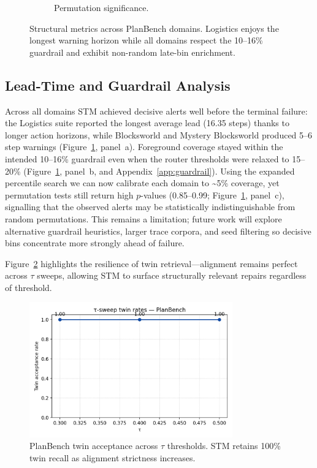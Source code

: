 \documentclass[11pt]{article}
\begin{document}
\begin{figure}[h]
\begin{subfigure}[t]{0.32\textwidth}
    \caption{Permutation significance.}
  \end{subfigure}
  \caption{Structural metrics across PlanBench domains. Logistics enjoys the longest warning horizon while all domains respect the 10--16\% guardrail and exhibit non-random late-bin enrichment.}
  \label{fig:planbench-metrics}
\end{figure}

\subsection{Lead-Time and Guardrail Analysis}
Across all domains STM achieved decisive alerts well before the terminal failure: the Logistics suite reported the longest average lead (16.35 steps) thanks to longer action horizons, while Blocksworld and Mystery Blocksworld produced 5--6 step warnings (Figure~\ref{fig:planbench-metrics}, panel~a). Foreground coverage stayed within the intended 10--16\% guardrail even when the router thresholds were relaxed to 15--20\% (Figure~\ref{fig:planbench-metrics}, panel~b, and Appendix~\ref{app:guardrail}). Using the expanded percentile search we can now calibrate each domain to \textasciitilde5\% coverage, yet permutation tests still return high $p$-values (0.85--0.99; Figure~\ref{fig:planbench-metrics}, panel~c), signalling that the observed alerts may be statistically indistinguishable from random permutations. This remains a limitation; future work will explore alternative guardrail heuristics, larger trace corpora, and seed filtering so decisive bins concentrate more strongly ahead of failure.

Figure~\ref{fig:tau-planbench} highlights the resilience of twin retrieval---alignment remains perfect across \(\tau\) sweeps, allowing STM to surface structurally relevant repairs regardless of threshold.

\begin{figure}[h]
  \centering
  \includegraphics[width=0.78\textwidth]{../note/fig_tau_sweep_planbench.png}
  \caption{PlanBench twin acceptance across \(\tau\) thresholds. STM retains 100\% twin recall as alignment strictness increases.}
  \label{fig:tau-planbench}
\end{figure}
\end{document}
